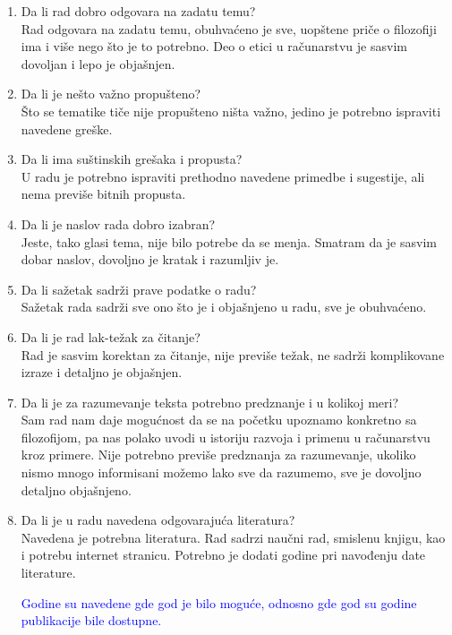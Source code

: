 \documentclass[a4paper]{report}
\newcommand{\odgovor}[1]{\textcolor{blue}{#1}}
\begin{document}
\begin{enumerate}
\item Da li rad dobro odgovara na zadatu temu?\\
Rad odgovara na zadatu temu, obuhvaćeno je sve, uopštene priče o filozofiji ima i više nego što je to potrebno. Deo o etici u računarstvu je sasvim dovoljan i lepo je objašnjen.

\item Da li je nešto važno propušteno?\\
Što se tematike tiče nije propušteno ništa važno, jedino je potrebno ispraviti navedene greške.

\item Da li ima suštinskih grešaka i propusta?\\
U radu je potrebno ispraviti prethodno navedene primedbe i sugestije, ali nema previše bitnih propusta.
\item Da li je naslov rada dobro izabran?\\
 Jeste, tako glasi tema, nije bilo potrebe da se menja. Smatram da je sasvim dobar naslov, dovoljno je kratak i razumljiv je.

\item Da li sažetak sadrži prave podatke o radu?\\
 Sažetak rada sadrži sve ono što je i objašnjeno u radu, sve je obuhvaćeno.

\item Da li je rad lak-težak za čitanje?\\
 Rad je sasvim korektan za čitanje, nije previše težak, ne sadrži komplikovane izraze i detaljno je objašnjen.

\item Da li je za razumevanje teksta potrebno predznanje i u kolikoj meri?\\ 
Sam rad nam daje mogućnost da se na početku upoznamo konkretno sa filozofijom, pa nas polako uvodi u istoriju razvoja i primenu u računarstvu kroz primere. Nije potrebno previše predznanja za razumevanje, ukoliko nismo mnogo informisani možemo lako sve da razumemo, sve je dovoljno detaljno objašnjeno.

\item Da li je u radu navedena odgovarajuća literatura?\\
Navedena je potrebna literatura. Rad sadrzi naučni rad, smislenu knjigu, kao i potrebu internet stranicu. Potrebno je dodati godine pri navođenju date literature.

\odgovor{Godine su navedene gde god je bilo moguće, odnosno gde god su godine publikacije bile dostupne.}


\end{enumerate}
\end{document}
